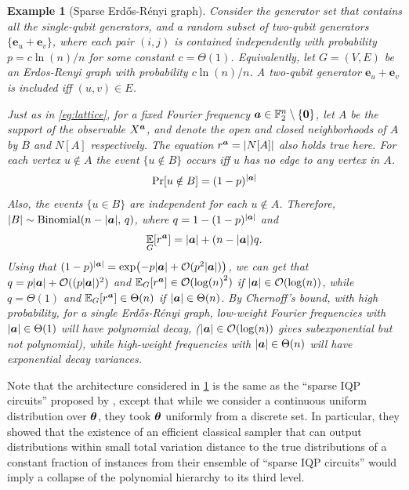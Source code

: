 \documentclass{article}
\theoremstyle{plain}
\newtheorem{example}[theorem]{Example}
\theoremstyle{definition}
\theoremstyle{remark}
\begin{document}
\begin{example}[Sparse Erd\H os-R\'enyi graph]
\label{eg:sparse}
Consider the generator set that contains all the single-qubit generators, and a random subset of two-qubit generators $\{\bm{e}_u+\bm{e}_v\}$, where each pair $(i,j)$ is contained independently with probability $p=c \ln(n)/n$ for some constant $c=\Theta(1)$. Equivalently, let $G=(V,E)$ be an Erdos-Renyi graph with probability $c \ln(n)/n$. A two-qubit generator $\bm{e}_u+\bm{e}_v$ is included iff $(u,v)\in E$.

Just as in \cref{eg:lattice}, for a fixed Fourier frequency ${\bm{a}} \in \mathbb{F}_2^n \setminus \{\bm{0}\}$, let $A$ be the support of the observable $X^{\bm{a}}$, and denote the open and closed neighborhoods of $A$ by $B$ and $N[A]$ respectively. The equation $r^{\bm{a}} = \abs{N[A]}$ also holds true here. For each  vertex $u\notin A$ the event $\{u\notin B\}$ occurs iff $u$ has no edge to any vertex in $A$.
\begin{equation}
\Pr[u\notin B] = (1-p)^{\abs{{\bm{a}}}}
\end{equation}
Also, the events $\{u\in B\}$ are independent for each $u \notin A$.
Therefore, $\abs{B} \sim \mathrm{Binomial}(n-\abs{{\bm{a}}},\,q)$, 
where $q = 1-(1-p)^{\abs{{\bm{a}}}}$ and \begin{equation}\operatorname*{\mathbb{E}}_G[r^{\bm{a}}] = \abs{{\bm{a}}} + (n-\abs{{\bm{a}}})q. \label{eq:sparse ra}
\end{equation}
Using that $(1-p)^\abs{{\bm{a}}} = \exp(-p\abs{{\bm{a}}} + \mathcal{O}(p^2\abs{{\bm{a}}}))$, we can get that $q=p\abs{{\bm{a}}} + \mathcal{O}((p\abs{{\bm{a}}})^2)$ and $\operatorname*{\mathbb{E}}_G[r^{\bm{a}}] \in \mathcal{O}(\log(n)^2)$ if $\abs{{\bm{a}}} \in \mathcal{O}(\log(n))$, while $q = \Theta(1)$ and $\operatorname*{\mathbb{E}}_G[r^{\bm{a}}] \in \Theta(n)$ if $\abs{{\bm{a}}} \in \Theta(n)$. By Chernoff's bound, with high probability, for a single Erd\H os-R\'enyi graph, low-weight Fourier frequencies with $\abs{{\bm{a}}} \in \Theta(1)$ will have polynomial decay, ($\abs{{\bm{a}}} \in \mathcal{O}(\log(n))$ gives subexponential but not polynomial), while high-weight frequencies with $\abs{{\bm{a}}} \in \Theta(n)$ will have exponential decay variances.
\end{example}

Note that the architecture considered in \cref{eg:sparse} is the same as the ``sparse IQP circuits'' proposed by \cite{Bremner17}, except that while we consider a continuous uniform distribution over ${\bm{\theta}}$, they took ${\bm{\theta}}$ uniformly from a discrete set. In particular, they showed that the existence of an efficient classical sampler that can output distributions
within small total variation distance to the true distributions of a constant fraction of instances from their ensemble of ``sparse IQP circuits'' would imply a collapse of the polynomial hierarchy
to its third level. \cite{Bremner17}
\end{document}
